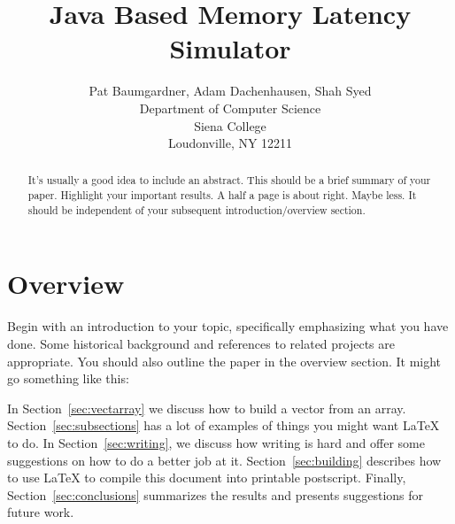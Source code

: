 \documentclass[12pt]{article}
\newcommand{\doublespace}{
  \protect\renewcommand\baselinestretch{1.5}
  \protect\normalsize
}
\begin{document}
\date{}

\title{Java Based Memory Latency Simulator}

\author{Pat Baumgardner, Adam Dachenhausen, Shah Syed\\
Department of Computer Science\\
Siena College\\
Loudonville, NY  12211
}

\maketitle
\thispagestyle{empty}

\begin{abstract}
It's usually a good idea to include an abstract.  This should be a
brief summary of your paper.  Highlight your important results.  A
half a page is about right.  Maybe less.  It should be independent of
your subsequent introduction/overview section.
\end{abstract}

\doublespace

\section{Overview}
\label{sec:overview}

Begin with an introduction to your topic, specifically emphasizing
what you have done.  Some historical background and references to
related projects are appropriate.  You should also outline the paper
in the overview section.  It might go something like this:

In Section~\ref{sec:vectarray} we discuss how to build a vector from
an array.  Section~\ref{sec:subsections} has a lot of examples of
things you might want \LaTeX~\cite{lamport86} to do.  In
Section~\ref{sec:writing}, we discuss how writing is hard and offer
some suggestions on how to do a better job at it.
Section~\ref{sec:building} describes how to use \LaTeX{} to compile
this document into printable postscript.  Finally,
Section~\ref{sec:conclusions} summarizes the results and presents
suggestions for future work.
\end{document}
